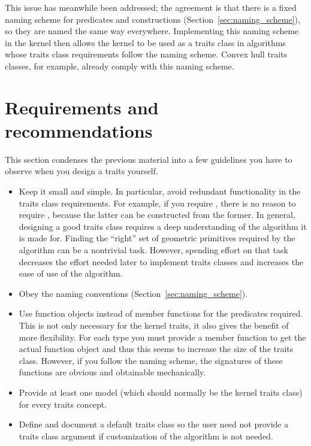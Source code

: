 This issue has meanwhile been addressed; the agreement is that there is
a fixed naming scheme for predicates and constructions 
(Section~\ref{sec:naming_scheme}), so they are named the same way everywhere. 
Implementing this naming scheme in the kernel
then allows the kernel to be used as a traits class in algorithms whose traits
class requirements follow the naming scheme. Convex hull traits classes,
for example, already comply with this naming scheme. 

\section{Requirements and recommendations}
\label{sec:traits_class_req_and_rec}

This section condenses the previous material into a few guidelines you
have to observe when you design a traits yourself.
\begin{itemize}
\item Keep it small and simple. In particular, avoid redundant functionality
      in the traits class requirements. For example, if you require 
      , there is no reason to require , 
      because the latter can be constructed from the former. In general, 
      designing a good traits class requires a deep understanding of the 
      algorithm it is made for. Finding the ``right'' set of geometric 
      primitives required by the algorithm can be a nontrivial task. 
      However, spending effort on that task decreases the effort needed 
      later to implement traits classes and increases the ease of use of 
      the algorithm. 

\item Obey the naming conventions (Section~\ref{sec:naming_scheme}).

\item Use function objects instead of member functions for the predicates
      required. This is not only necessary for the kernel traits, it also 
      gives the benefit of more flexibility. For each type you must provide
      a member function to get the actual function object and thus this seems
      to increase the size of the traits class.
      However, if you follow the naming scheme, the 
      signatures of these functions are obvious and obtainable mechanically.

\item Provide at least one model (which should normally be the kernel
      traits class) for every traits concept.

\item Define and document a  default traits class so the user need not provide 
      a traits class argument if customization of the algorithm is not needed.

\end{itemize} 

